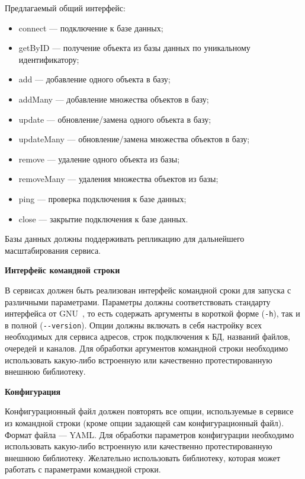 Предлагаемый общий интерфейс:
\begin{itemize}
    \item connect — подключение к базе данных;
	\item getByID — получение объекта из базы данных по уникальному идентификатору;
	\item add — добавление одного объекта в базу;
	\item addMany — добавление множества объектов в базу;
	\item update — обновление/замена одного объекта в базу;
	\item updateMany — обновление/замена множества объектов в базу;
	\item remove — удаление одного объекта из базы;
	\item removeMany — удаления множества объектов из базы;
	\item ping — проверка подключения к базе данных;
	\item close — закрытие подключения к базе данных.
\end{itemize}

Базы данных должны поддерживать репликацию для дальнейшего масштабирования сервиса.

\textbf{Интерфейс командной строки}

В сервисах должен быть реализован интерфейс командной сроки для запуска с различными параметрами. Параметры должны соответствовать стандарту интерфейса от GNU~\cite{gnu_cli}, то есть содержать аргументы в короткой форме (\lstinline{-h}), так и в полной (\lstinline{--version}). Опции должны включать в себя настройку всех необходимых для сервиса адресов, строк подключения к БД, названий файлов, очередей и каналов. Для обработки аргументов командной строки необходимо использовать какую-либо встроенную или качественно протестированную внешнюю библиотеку.

\textbf{Конфигурация}

Конфигурационный файл должен повторять все опции, используемые в сервисе из командной строки (кроме опции задающей сам конфигурационный файл). Формат файла — YAML. Для обработки параметров конфигурации необходимо использовать какую-либо встроенную или качественно протестированную внешнюю библиотеку. Желательно использовать библиотеку, которая может работать с параметрами командной строки.

